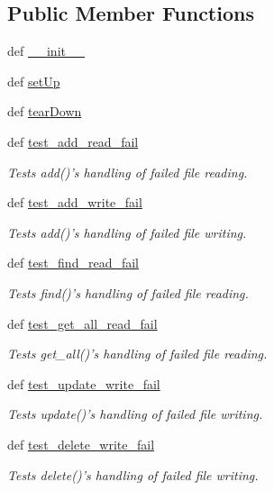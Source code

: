 \subsection*{\-Public \-Member \-Functions}
\begin{DoxyCompactItemize}
\item 
def \hyperlink{classtest__taskstorage_1_1TestFileStorage_a3aeeb19983b93f40da74ca6f741bca7b}{\-\_\-\-\_\-init\-\_\-\-\_\-}
\item 
def \hyperlink{classtest__taskstorage_1_1TestFileStorage_adf1f62f0b4f514585227479a35c2518d}{set\-Up}
\item 
def \hyperlink{classtest__taskstorage_1_1TestFileStorage_a2c10eb94b9fa8f243eabdc40331195e1}{tear\-Down}
\item 
def \hyperlink{classtest__taskstorage_1_1TestFileStorage_a94f3a21c9b66c5351712e79942526f25}{test\-\_\-add\-\_\-read\-\_\-fail}
\begin{DoxyCompactList}\small\item\em \-Tests add()'s handling of failed file reading. \end{DoxyCompactList}\item 
def \hyperlink{classtest__taskstorage_1_1TestFileStorage_a577f8c7ca1fb81d18062761d609113a6}{test\-\_\-add\-\_\-write\-\_\-fail}
\begin{DoxyCompactList}\small\item\em \-Tests add()'s handling of failed file writing. \end{DoxyCompactList}\item 
def \hyperlink{classtest__taskstorage_1_1TestFileStorage_a14e1c7da85f39ebc27eeb51bf443447b}{test\-\_\-find\-\_\-read\-\_\-fail}
\begin{DoxyCompactList}\small\item\em \-Tests find()'s handling of failed file reading. \end{DoxyCompactList}\item 
def \hyperlink{classtest__taskstorage_1_1TestFileStorage_aff0b0b77c268949c05df2a26679e7600}{test\-\_\-get\-\_\-all\-\_\-read\-\_\-fail}
\begin{DoxyCompactList}\small\item\em \-Tests get\-\_\-all()'s handling of failed file reading. \end{DoxyCompactList}\item 
def \hyperlink{classtest__taskstorage_1_1TestFileStorage_aa5f6b47510be7afc5644fe0960a2306d}{test\-\_\-update\-\_\-write\-\_\-fail}
\begin{DoxyCompactList}\small\item\em \-Tests update()'s handling of failed file writing. \end{DoxyCompactList}\item 
def \hyperlink{classtest__taskstorage_1_1TestFileStorage_a3abac0acbf03cf24f4b73ea6bf2ba57e}{test\-\_\-delete\-\_\-write\-\_\-fail}
\begin{DoxyCompactList}\small\item\em \-Tests delete()'s handling of failed file writing. \end{DoxyCompactList}\end{DoxyCompactItemize}
